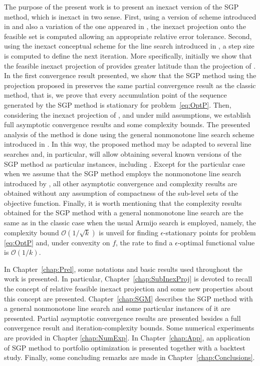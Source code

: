 The purpose of the present  work is to present an inexact version of the SGP method, which  is inexact in two sense. First,  using  a version of  scheme introduced in \cite{BirginMartinezRaydan2003} and also a variation of the one appeared in \cite[Example 1]{VillaSalzo2013},  the inexact projection  onto the feasible  set is computed  allowing an appropriate  relative error tolerance. Second,  using the inexact  conceptual scheme for the  line search  introduced  in  \cite{GrapigliaSachs2020, SachsSachs2011}, a step size is computed  to define the next iteration.   More specifically, initially we show that the  feasible inexact  projection of \cite{BirginMartinezRaydan2003} provides greater latitude than the projection of \cite[Example 1]{VillaSalzo2013}.  In the first  convergence result presented, we show that the SGP method using the projection proposed in \cite{BirginMartinezRaydan2003} preserves the same partial convergence result as the classic method, that is, we prove that every accumulation point  of the sequence generated by the SGP method is stationary for problem~\eqref{eq:OptP}. Then, considering the inexact projection of \cite[Example 1]{VillaSalzo2013}, and  under mild  assumptions,  we establish  full asymptotic convergence results  and  some complexity bounds. The  presented analysis of the method is done using the general  nonmonotone line search scheme  introduced in \cite{GrapigliaSachs2020}. In this way, the proposed method may be adapted to several line searches and, in particular, will allow obtaining several known versions of the SGP method as particular instances,  including  \cite{yunier_roman2010,BirginMartinezRaydan2003,Iusem2003,Xihong2018}. Except for the particular case when we assume that the SGP method employs  the nonmonotone line search introduced by \cite{Grippo1986}, all other  asymptotic convergence and complexity  results are obtained without any assumption of compactness of the sub-level sets of the objective function.  Finally, it is worth mentioning that the complexity results obtained  for the SGP method with a general nonmonotone line search  are the same as in the classic case when the usual Armijo search is employed, namely,  the complexity bound  $\mathcal{O}(1/\sqrt{k})$ is unveil for finding $\epsilon$-stationary points for problem \eqref{eq:OptP} and, under convexity on $f$, the rate to find a $\epsilon$-optimal functional value is $\mathcal{O}(1/k)$.

In Chapter~\ref{chap:Prel}, some notations and basic results used throughout the work is presented. In particular, Chapter~\ref{chap:SubInexProj} is devoted to recall the concept of relative feasible inexact projection and some  new properties about this concept are presented. Chapter~\ref{chap:SGM}  describes the SGP method with a general nonmonotone line search and some particular instances of it are presented.  Partial asymptotic convergence results  are presented besides a full   convergence result  and iteration-complexity bounds. Some numerical experiments are provided in Chapter \ref{chap:NumExp}. In Chapter~\ref{chap:App}, an application of SGP method to portfolio optimization is presented together with a backtest study. Finally, some concluding remarks are made in Chapter~\ref{chap:Conclusions}.
